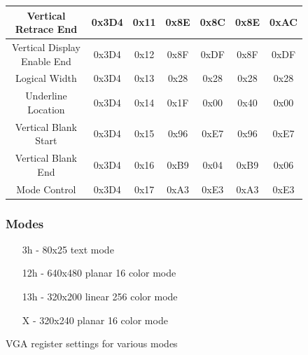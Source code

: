 \begin{appendices}
\begin{figure}[H]
\begin{tabular}{|c|c|c|c|c|c|c|}
\hline
Vertical Retrace End&0x3D4&0x11&0x8E&0x8C&0x8E&0xAC\\
\hline
Vertical Display Enable End&0x3D4&0x12&0x8F&0xDF&0x8F&0xDF\\
\hline
Logical Width&0x3D4&0x13&0x28&0x28&0x28&0x28\\
\hline
Underline Location&0x3D4&0x14&0x1F&0x00&0x40&0x00\\
\hline
Vertical Blank Start&0x3D4&0x15&0x96&0xE7&0x96&0xE7\\
\hline
Vertical Blank End&0x3D4&0x16&0xB9&0x04&0xB9&0x06\\
\hline
Mode Control&0x3D4&0x17&0xA3&0xE3&0xA3&0xE3\\
\hline
\end{tabular}
\subsubsection*{Modes}
\begin{itemize}
    \item[3h] - 80x25 text mode
    \item[12h] - 640x480 planar 16 color mode
    \item[13h] - 320x200 linear 256 color mode
    \item[X] - 320x240 planar 16 color mode
\end{itemize}
\caption{VGA register settings for various modes \cite{osdevvga}}
\end{figure}


\end{appendices}

